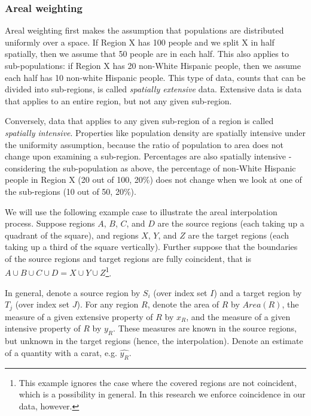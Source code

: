 \documentclass[12pt,twoside]{reedthesis}
\theoremstyle{definition}
\theoremstyle{definition}
\theoremstyle{definition}
\theoremstyle{remark}
\begin{document}
\hypertarget{areal-weighting}{%
\subsubsection{Areal weighting}\label{areal-weighting}}

Areal weighting first makes the assumption that populations are
distributed uniformly over a space. If Region X has 100 people and we
split X in half spatially, then we assume that 50 people are in each
half. This also applies to sub-populations: if Region X has 20 non-White
Hispanic people, then we assume each half has 10 non-white Hispanic
people. This type of data, counts that can be divided into sub-regions,
is called \emph{spatially extensive} data. Extensive data is data that
applies to an entire region, but not any given sub-region.

Conversely, data that applies to any given sub-region of a region is
called \emph{spatially intensive}. Properties like population density
are spatially intensive under the uniformity assumption, because the
ratio of population to area does not change upon examining a sub-region.
Percentages are also spatially intensive - considering the
sub-population as above, the percentage of non-White Hispanic people in
Region X (20 out of 100, 20\%) does not change when we look at one of
the sub-regions (10 out of 50, 20\%).

We will use the following example case to illustrate the areal
interpolation process. Suppose regions \(A\), \(B\), \(C\), and \(D\)
are the source regions (each taking up a quadrant of the square), and
regions \(X\), \(Y\), and \(Z\) are the target regions (each taking up a
third of the square vertically). Further suppose that the boundaries of
the source regions and target regions are fully coincident, that is
\(A \cup B \cup C \cup D = X \cup Y \cup Z\)\footnote{This example
  ignores the case where the covered regions are not coincident, which
  is a possibility in general. In this research we enforce coincidence
  in our data, however.}.

In general, denote a source region by \(S_i\) (over index set \(I\)) and
a target region by \(T_j\) (over index set \(J\)). For any region \(R\),
denote the area of \(R\) by \(Area(R)\), the measure of a given
extensive property of \(R\) by \(x_R\), and the measure of a given
intensive property of \(R\) by \(y_R\). These measures are known in the
source regions, but unknown in the target regions (hence, the
interpolation). Denote an estimate of a quantity with a carat, e.g.
\(\widehat{y_{R}}\).
\end{document}
